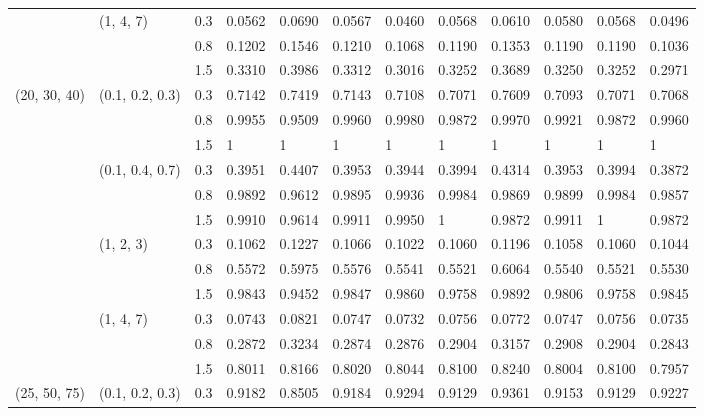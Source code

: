 \begin{table}[h]
\begin{tabular}{llllllllllll}
             		& (1, 4, 7)       	& 0.3 	& 0.0562 	& 0.0690  & 0.0567 	& 0.0460 	& 0.0568 	& 0.0610  	& 0.0580 	& 0.0568 	& 0.0496 \\
             		&                 	& 0.8 	& 0.1202 	& 0.1546 	& 0.1210  	& 0.1068 	& 0.1190  	& 0.1353 	& 0.1190  	& 0.1190  	& 0.1036 \\
             		&                 	& 1.5 	& 0.3310 	& 0.3986 	& 0.3312 	& 0.3016 	& 0.3252 	& 0.3689 	& 0.3250  	& 0.3252 	& 0.2971 \\\hline
(20, 30, 40) 	& (0.1, 0.2, 0.3) & 0.3 	& 0.7142 	& 0.7419 	& 0.7143 	& 0.7108 	& 0.7071 	& 0.7609 	& 0.7093 	& 0.7071 	& 0.7068 \\
             		&                 	& 0.8 	& 0.9955 	& 0.9509 	& 0.9960 	& 0.9980 	& 0.9872 	& 0.9970  	& 0.9921 	& 0.9872 	& 0.9960  \\
             		&                 	& 1.5 	& 1	 	& 1		& 1	 	& 1 		& 1	 	& 1	  	& 1	 	& 1	 	& 1	        \\
             		& (0.1, 0.4, 0.7) & 0.3 	& 0.3951 	& 0.4407 	& 0.3953 	& 0.3944 	& 0.3994 	& 0.4314 	& 0.3953 	& 0.3994 	& 0.3872 \\
             		&                 	& 0.8 	& 0.9892 	& 0.9612 	& 0.9895 	& 0.9936 	& 0.9984 	& 0.9869 	& 0.9899 	& 0.9984 	& 0.9857 \\
             		&                 	& 1.5 	& 0.9910 	& 0.9614 	& 0.9911 	& 0.9950 	& 1     	& 0.9872 	& 0.9911 	& 1      	& 0.9872 \\
             		& (1, 2, 3)       	& 0.3 	& 0.1062 	& 0.1227 	& 0.1066 	& 0.1022 	& 0.1060  	& 0.1196 	& 0.1058	& 0.1060  	& 0.1044 \\
             		&                 	& 0.8 	& 0.5572 	& 0.5975 	& 0.5576 	& 0.5541 	& 0.5521 	& 0.6064 	& 0.5540 	& 0.5521 	& 0.5530 \\
             		&                 	& 1.5 	& 0.9843 	& 0.9452 	& 0.9847 	& 0.9860 	& 0.9758 	& 0.9892 	& 0.9806 	& 0.9758 	& 0.9845 \\
             		& (1, 4, 7)       	& 0.3 	& 0.0743 	& 0.0821 	& 0.0747 	& 0.0732 	& 0.0756 	& 0.0772 	& 0.0747 	& 0.0756 	& 0.0735 \\
             		&                 	& 0.8 	& 0.2872 	& 0.3234 	& 0.2874 	& 0.2876 	& 0.2904 	& 0.3157 	& 0.2908 	& 0.2904 	& 0.2843 \\
             		&                 	& 1.5 	& 0.8011   & 0.8166 	& 0.8020 	& 0.8044 	& 0.8100  	& 0.8240 	& 0.8004 	& 0.8100  	& 0.7957 \\\hline
(25, 50, 75) 	& (0.1, 0.2, 0.3) & 0.3 	& 0.9182 	& 0.8505 	& 0.9184 	& 0.9294 	& 0.9129 	& 0.9361 	& 0.9153 	& 0.9129 	& 0.9227 \\

\end{tabular}
\end{table}
